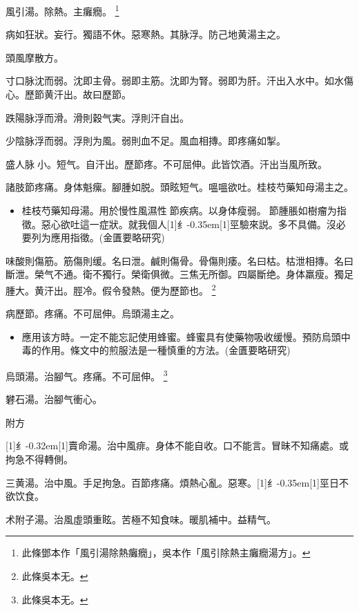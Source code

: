 \documentclass[oneside,b4paper]{ctexbook}
\begin{document}
\begin{flushleft}
風引湯。除熱。主癱癇。
\footnote{此條鄧本作「風引湯除熱癱癇」，吳本作「風引除熱主癱癇湯方」。}

病如狂狀。妄行。獨語不休。惡寒熱。其脉浮。防己地黄湯主之。

頭風摩散方。

寸口脉沈而弱。沈即主骨。弱即主筋。沈即为腎。弱即为肝。汗出入水中。如水傷心。歷節黄汗出。故曰歷節。

跌陽脉浮而滑。滑則穀气実。浮則汗自出。

少陰脉浮而弱。浮則为風。弱則血不足。風血相摶。即疼痛如掣。

盛人脉{𬈧}小。短气。自汗出。歷節疼。不可屈伸。此皆饮酒。汗出当風所致。

諸肢節疼痛。身体魁瘰。腳腫如脱。頭眩短气。嗢嗢欲吐。桂枝芍藥知母湯主之。

\begin{itemize}
\item 桂枝芍藥知母湯。用於慢性風濕性{𬮦}節疾病。以身体瘦弱。{𬮦}節腫脹如樹瘤为指徵。惡心欲吐這一症狀。就我個人{\hbox{\scalebox{0.68}[1]{纟}\kern-0.35em\scalebox{0.64}[1]{巠}}}驗來説。多不具備。沒必要列为應用指徵。(金匱要略研究)
\end{itemize}

味酸則傷筋。筋傷則缓。名曰泄。鹹則傷骨。骨傷則痿。名曰枯。枯泄相摶。名曰斷泄。榮气不通。衛不獨行。榮衛俱微。三焦无所御。四屬斷绝。身体羸瘦。獨足腫大。黄汗出。脛冷。假令發熱。便为歷節也。
\footnote{此條吳本无。}

病歷節。疼痛。不可屈伸。烏頭湯主之。

\begin{itemize}
\item 應用该方時。一定不能忘記使用蜂蜜。蜂蜜具有使藥物吸收缓慢。預防烏頭中毒的作用。條文中的煎服法是一種慎重的方法。(金匱要略研究)
\end{itemize}

烏頭湯。治腳气。疼痛。不可屈伸。
\footnote{此條吳本无。}

礬石湯。治腳气衝心。

附方

{\hbox{\scalebox{0.6}[1]{纟}\kern-0.32em\scalebox{0.7}[1]{賣}}}命湯。治中風痱。身体不能自收。口不能言。冒昧不知痛處。或拘急不得轉側。

三黄湯。治中風。手足拘急。百節疼痛。煩熱心亂。惡寒。{\hbox{\scalebox{0.68}[1]{纟}\kern-0.35em\scalebox{0.64}[1]{巠}}}日不欲饮食。

术附子湯。治風虛頭重眩。苦極不知食味。暖肌補中。益精气。


\end{flushleft}
\end{document}
